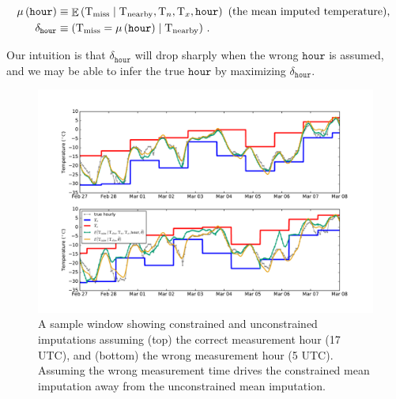\documentclass[letter]{article}
\makeatletter
\def\maxwidth{\ifdim\Gin@nat@width>\linewidth\linewidth
\else\Gin@nat@width\fi}
\let\Oldincludegraphics\includegraphics
\renewcommand{\includegraphics}[1]{\Oldincludegraphics[width=0.98\maxwidth]{#1}}
\newcommand{\genericdel}[3]{%
      \left#1#3\right#2
    }
\newcommand{\del}[1]{\genericdel(){#1}}
\let\Pr\relax
\DeclareMathOperator{\Pr}{\mathbb{P}}
\DeclareMathOperator{\E}{\mathbb{E}}
\newcommand{\T}{\mathrm{T}}
\newcommand{\Tn}{\T_{n}}
\newcommand{\Tx}{\T_{x}}
\newcommand{\miss}{\mathrm{miss}}
\newcommand{\obs}{\mathrm{nearby}}
\newcommand{\hour}{\mathtt{hour}}
\newcommand{\discrepancy}{\delta}
\makeatother
\begin{document}
\begin{equation}
\begin{split}
    \mu\del{\hour} &\equiv \E\del{ \T_\miss \mid \T_\obs, \Tn, \Tx, \hour } \text{ (the mean imputed temperature), }\\
    \discrepancy_\hour &\equiv \Pr\del{ \T_\miss = \mu\del{\hour} \mid \T_\obs }\,.
\end{split}
\end{equation}

Our intuition is that \(\discrepancy_\hour\) will drop sharply when the wrong \(\hour\) is assumed,
and we may be able to infer the true \(\hour\) by maximizing \(\discrepancy_\hour\).
    


        \begin{figure}
\centering
\includegraphics{../figures/measure_hour_example.pdf}
\caption{\label{fig:measure_hour_example} A sample window showing constrained and unconstrained imputations assuming (top) the correct measurement hour (17 UTC), and (bottom) the wrong measurement hour (5 UTC). Assuming the wrong measurement time drives the constrained mean imputation away from the unconstrained mean imputation.}
\end{figure}
    
\end{document}
